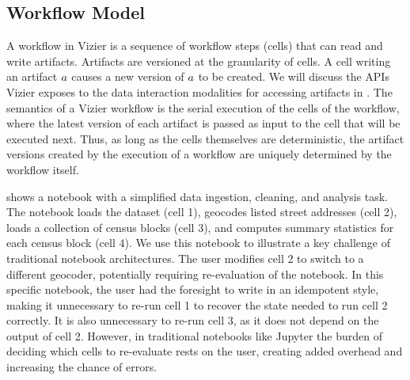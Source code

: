 \subsection{Workflow Model}
\label{sec:vizier:eval}

A workflow in Vizier is a sequence of workflow steps (cells) that can read and write artifacts. 
Artifacts are versioned at the granularity of cells. 
A cell writing an artifact $a$ causes a new version of $a$ to be created. 
We will discuss the APIs Vizier exposes to the data interaction modalities for accessing artifacts in . 
The semantics of a Vizier workflow is the serial execution of the cells of the workflow, where the latest version of each artifact is passed as input to the cell that will be executed next. 
Thus, as long as the cells themselves are deterministic, the artifact versions created by the execution of a workflow are uniquely determined by the workflow itself.

\begin{exam}
  \label{ex:introduction}
   shows a notebook with a simplified data ingestion, cleaning, and analysis task.
  The notebook loads the dataset (cell 1), geocodes listed street addresses (cell 2), loads a collection of census blocks (cell 3), and computes summary statistics for each census block (cell 4).
  We use this  notebook to illustrate a key challenge of traditional  notebook architectures.
  The user modifies cell 2 to switch to a different geocoder, potentially requiring re-evaluation of the notebook.
  In this specific notebook, the user had the foresight to write in an idempotent style, making it unnecessary to re-run cell 1 to recover the state needed to run cell 2 correctly.
  It is also unnecessary to re-run cell 3, as it does not depend on the output of cell 2.
  However, in traditional notebooks like Jupyter the burden of deciding which cells to re-evaluate rests on the user, creating added overhead and increasing the chance of errors.
\end{exam}

